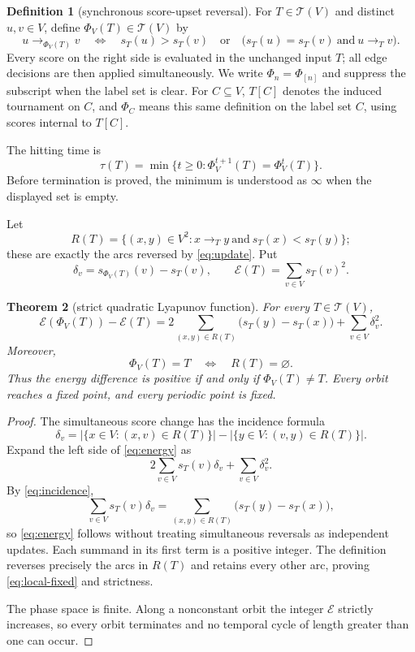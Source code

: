 \documentclass[11pt,a4paper]{amsart}
\newtheorem{theorem}{Theorem}[section]
\theoremstyle{definition}
\newtheorem{definition}[theorem]{Definition}
\theoremstyle{remark}
\newcommand{\Tourn}{\mathcal T}
\newcommand{\Energy}{\mathcal E}
\begin{document}
\begin{definition}[synchronous score-upset reversal]\label{def:update}
For $T\in\Tourn(V)$ and distinct $u,v\in V$, define
$\Phi_V(T)\in\Tourn(V)$ by
\begin{equation}\label{eq:update}
 u\to_{\Phi_V(T)}v
 \quad\Longleftrightarrow\quad
 s_T(u)>s_T(v)
 \quad\text{or}\quad
 \bigl(s_T(u)=s_T(v)\ \text{and}\ u\to_Tv\bigr).
\end{equation}
Every score on the right side is evaluated in the unchanged input $T$;
all edge decisions are then applied simultaneously.  We write
$\Phi_n=\Phi_{[n]}$ and suppress the subscript when the label set is clear.
For $C\subseteq V$, $T[C]$ denotes the induced tournament on $C$, and
$\Phi_C$ means this same definition on the label set $C$, using scores
internal to $T[C]$.

The hitting time is
\[
 \tau(T)=\min\{t\geq0:\Phi_V^{t+1}(T)=\Phi_V^t(T)\}.
\]
Before termination is proved, the minimum is understood as $\infty$ when
the displayed set is empty.
\end{definition}

Let
\[
 R(T)=\{(x,y)\in V^2:x\to_Ty\ \text{and}\ s_T(x)<s_T(y)\};
\]
these are exactly the arcs reversed by \eqref{eq:update}.  Put
\[
 \delta_v=s_{\Phi_V(T)}(v)-s_T(v),\qquad
 \Energy(T)=\sum_{v\in V}s_T(v)^2.
\]

\begin{theorem}[strict quadratic Lyapunov function]\label{thm:energy}
For every $T\in\Tourn(V)$,
\begin{equation}\label{eq:energy}
 \Energy(\Phi_V(T))-\Energy(T)
 =2\sum_{(x,y)\in R(T)}\bigl(s_T(y)-s_T(x)\bigr)
  +\sum_{v\in V}\delta_v^2.
\end{equation}
Moreover,
\begin{equation}\label{eq:local-fixed}
             \Phi_V(T)=T\quad\Longleftrightarrow\quad R(T)=\varnothing.
\end{equation}
Thus the energy difference is positive if and only if $\Phi_V(T)\ne T$.
Every orbit reaches a fixed point, and every periodic point is fixed.
\end{theorem}

\begin{proof}
The simultaneous score change has the incidence formula
\begin{equation}\label{eq:incidence}
 \delta_v=
 \bigl|\{x\in V:(x,v)\in R(T)\}\bigr|
 -\bigl|\{y\in V:(v,y)\in R(T)\}\bigr|.
\end{equation}
Expand the left side of \eqref{eq:energy} as
\[
 2\sum_{v\in V}s_T(v)\delta_v+\sum_{v\in V}\delta_v^2.
\]
By \eqref{eq:incidence},
\[
 \sum_{v\in V}s_T(v)\delta_v
 =\sum_{(x,y)\in R(T)}\bigl(s_T(y)-s_T(x)\bigr),
\]
so \eqref{eq:energy} follows without treating simultaneous reversals as
independent updates.  Each summand in its first term is a positive integer.
The definition reverses precisely the arcs in $R(T)$ and retains every
other arc, proving \eqref{eq:local-fixed} and strictness.

The phase space is finite.  Along a nonconstant orbit the integer
$\Energy$ strictly increases, so every orbit terminates and no temporal
cycle of length greater than one can occur.
\end{proof}
\end{document}
